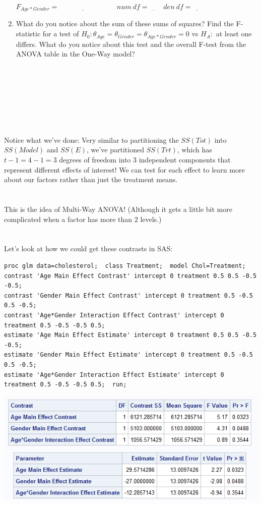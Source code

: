 \begin{enumerate}
$F_{Age*Gender}=\underbar{~~~~~~~~~~~~~~~~~~~~~~~~~~~~~~~~}~~~~~num~df=\underbar{~~~~~~~}~~den~df=\underbar{~~~~~~~}$
\item What do you notice about the sum of these sums of squares?  Find the F-statistic for a test of $H_0:\theta_{Age}=\theta_{Gender}=\theta_{Age*Gender}=0$ vs $H_A:$ at least one differs.  What do you notice about this test and the overall F-test from the ANOVA table in the One-Way model?\\~\\~\\~\\~\\~\\~\\~\\
\end{enumerate}
Notice what we've done:  Very similar to partitioning the $SS(Tot)$ into $SS(Model)$ and $SS(E)$, we've partitioned $SS(Trt)$, which has $t-1=4-1=3$ degrees of freedom into 3 independent components that represent different effects of interest!  We can test for each effect to learn more about our factors rather than just the treatment means.\\~\\~\\
This is the idea of Multi-Way ANOVA!  (Although it gets a little bit more complicated when a factor has more than 2 levels.)\\~\\~\\
Let's look at how we could get these contrasts in SAS:
\begin{small}
\begin{verbatim}
proc glm data=cholesterol;  class Treatment;  model Chol=Treatment;
contrast 'Age Main Effect Contrast' intercept 0 treatment 0.5 0.5 -0.5 -0.5;
contrast 'Gender Main Effect Contrast' intercept 0 treatment 0.5 -0.5 0.5 -0.5;
contrast 'Age*Gender Interaction Effect Contrast' intercept 0 treatment 0.5 -0.5 -0.5 0.5;
estimate 'Age Main Effect Estimate' intercept 0 treatment 0.5 0.5 -0.5 -0.5;
estimate 'Gender Main Effect Estimate' intercept 0 treatment 0.5 -0.5 0.5 -0.5;
estimate 'Age*Gender Interaction Effect Estimate' intercept 0 treatment 0.5 -0.5 -0.5 0.5;  run;
\end{verbatim}
\end{small}

\begin{center}
\includegraphics[scale=0.75]{CholContrasts}
\end{center}

